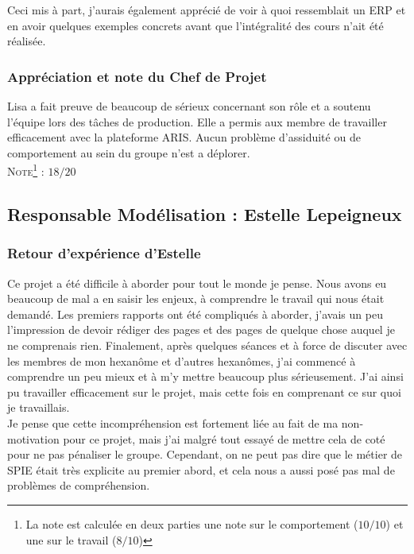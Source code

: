 Ceci mis à part, j’aurais également apprécié de voir à quoi ressemblait un ERP et en avoir quelques exemples concrets avant que l’intégralité des cours n’ait été réalisée.

\subsubsection{Appréciation et note du Chef de Projet}

Lisa a fait preuve de beaucoup de sérieux concernant son rôle et a soutenu l’équipe lors des tâches de production. Elle a permis aux membre de travailler efficacement avec la plateforme ARIS. Aucun problème d’assiduité ou de comportement au sein du groupe n’est a déplorer.\\

\noindent\textsc{Note\footnote{La note est calculée en deux parties une note sur le comportement ($10/10$) et une sur le travail ($8/10$)} :} $18/20$

\subsection{Responsable Modélisation : Estelle Lepeigneux}

\subsubsection{Retour d'expérience d'Estelle}

Ce projet a été difficile à aborder pour tout le monde je pense. Nous avons eu beaucoup de mal a en saisir les enjeux, à comprendre le travail qui nous était demandé. Les premiers rapports ont été compliqués à aborder, j’avais un peu l’impression de devoir rédiger des pages et des pages de quelque chose auquel je ne comprenais rien. Finalement, après quelques séances et à force de discuter avec les membres de mon hexanôme et d’autres hexanômes, j’ai commencé à comprendre un peu mieux et à m’y mettre beaucoup plus sérieusement. J’ai ainsi pu travailler efficacement sur le projet, mais cette fois en comprenant ce sur quoi je travaillais. \\

Je pense que cette incompréhension est fortement liée au fait de ma non-motivation pour ce projet, mais j’ai malgré tout essayé de mettre cela de coté pour ne pas pénaliser le groupe. Cependant, on ne peut pas dire que le métier de SPIE était très explicite au premier abord, et cela nous a aussi posé pas mal de problèmes de compréhension. \\

